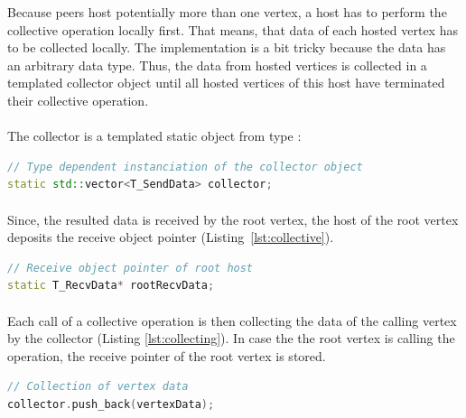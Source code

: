 Because peers host potentially more than one vertex, a host has to
perform the collective operation locally first. That means, that data
of each hosted vertex has to be collected locally.  The implementation
is a bit tricky because the data has an arbitrary data type. Thus, the
data from hosted vertices is collected in a templated collector object
until all hosted vertices of this host have terminated their
collective operation.

\paragraph*{}
The collector is a templated static object from type :
\begin{lstlisting}[language=C++, label=lst:static_collective]
// Type dependent instanciation of the collector object
static std::vector<T_SendData> collector;
\end{lstlisting}

\paragraph*{}
Since, the resulted data is received by the root vertex, the host of
the root vertex deposits the receive object pointer
(Listing~\ref{lst:collective}).

\begin{lstlisting}[language=C++, label=lst:root]
// Receive object pointer of root host
static T_RecvData* rootRecvData;

\end{lstlisting}

\paragraph*{}
Each call of a collective operation is then collecting the data of the
calling vertex by the collector (Listing \ref{lst:collecting}).  In
case the the root vertex is calling the operation, the receive pointer
of the root vertex is stored.
\begin{lstlisting}[language=C++, label=lst:collecting]
// Collection of vertex data
collector.push_back(vertexData);
\end{lstlisting}


